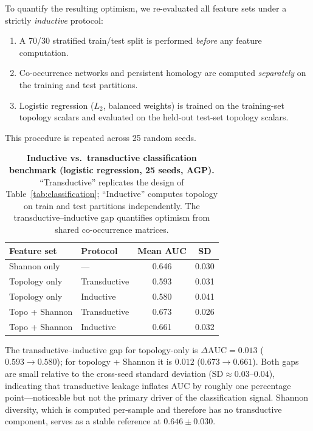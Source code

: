To quantify the resulting optimism, we re-evaluated all feature sets under a
strictly \emph{inductive} protocol:
\begin{enumerate}[leftmargin=*, itemsep=2pt]
  \item A 70/30 stratified train/test split is performed \emph{before} any
    feature computation.
  \item Co-occurrence networks and persistent homology are computed
    \emph{separately} on the training and test partitions.
  \item Logistic regression ($L_2$, balanced weights) is trained on the
    training-set topology scalars and evaluated on the held-out test-set
    topology scalars.
\end{enumerate}
This procedure is repeated across 25 random seeds.

\begin{table}[H]
\centering
\caption{%
  \textbf{Inductive vs.\ transductive classification benchmark
  (logistic regression, 25 seeds, AGP).}
  ``Transductive'' replicates the design of Table~\ref{tab:classification};
  ``Inductive'' computes topology on train and test partitions independently.
  The transductive--inductive gap quantifies optimism from shared
  co-occurrence matrices.
}
\label{tab:inductive}
\small
\setlength{\tabcolsep}{7pt}
\begin{tabular}{llcc}
\toprule
\textbf{Feature set} & \textbf{Protocol} & \textbf{Mean AUC} & \textbf{SD} \\
\midrule
Shannon only            & ---          & 0.646 & 0.030 \\
Topology only           & Transductive & 0.593 & 0.031 \\
Topology only           & Inductive    & 0.580 & 0.041 \\
Topo + Shannon          & Transductive & 0.673 & 0.026 \\
Topo + Shannon          & Inductive    & 0.661 & 0.032 \\
\bottomrule
\end{tabular}
\end{table}

The transductive--inductive gap for topology-only is $\Delta\text{AUC} = 0.013$
($0.593 \to 0.580$); for topology + Shannon it is $0.012$
($0.673 \to 0.661$).
Both gaps are small relative to the cross-seed standard deviation
($\text{SD} \approx 0.03$--$0.04$), indicating that transductive leakage
inflates AUC by roughly one percentage point---noticeable but not the primary
driver of the classification signal.
Shannon diversity, which is computed per-sample and therefore has no
transductive component, serves as a stable reference at $0.646 \pm 0.030$.

